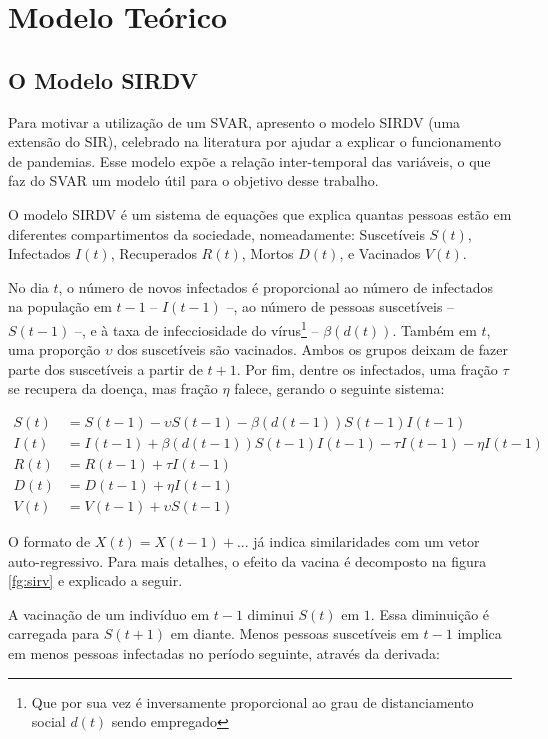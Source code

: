 \documentclass[
    article,
	12pt,				%
	oneside,			%
	a4paper,			%
	english,			%
	brazil,				%
	hyperref = {colorlinks, citecolor=c1d, linkcolor=c2d, urlcolor=c3d, colorlinks}
	]{abntex2}
\newcounter{j}
\begin{document}
\let\clearpage\relax
\chapter{Modelo Teórico}\label{sec:teorico}

\section{O Modelo SIRDV}

Para motivar a utilização de um SVAR, apresento o modelo SIRDV (uma extensão do SIR), celebrado na literatura por ajudar a explicar o funcionamento de pandemias. Esse modelo expõe a relação inter-temporal das variáveis, o que faz do SVAR um modelo útil para o objetivo desse trabalho.

O modelo SIRDV é um sistema de equações que explica quantas pessoas estão em diferentes compartimentos da sociedade, nomeadamente: Suscetíveis $S(t)$, Infectados $I(t)$, Recuperados $R(t)$, Mortos $D(t)$, e Vacinados $V(t)$.

No dia $t$, o número de novos infectados é proporcional ao número de infectados na população em $t-1$ -- $I(t-1)$ --, ao número de pessoas suscetíveis -- $S(t-1)$ --, e à taxa de infecciosidade do vírus\footnote{Que por sua vez é inversamente proporcional ao grau de distanciamento social $d(t)$ sendo empregado} -- $\beta(d(t))$. Também em $t$, uma proporção $\upsilon$ dos suscetíveis são vacinados. Ambos os grupos deixam de fazer parte dos suscetíveis a partir de $t+1$. Por fim, dentre os infectados, uma fração $\tau$ se recupera da doença, mas fração $\eta$ falece, gerando o seguinte sistema:

\begin{align*}
    S(t) &= S(t-1) - \upsilon S(t-1) - \beta(d(t-1))S(t-1)I(t-1)\\
    I(t) &= I(t-1) + \beta(d(t-1))S(t-1)I(t-1) - \tau I(t-1) - \eta I(t-1)\\
    R(t) &= R(t-1) + \tau I(t-1)\\
    D(t) &= D(t-1) + \eta I(t-1)\\
    V(t) &= V(t-1) + \upsilon S(t-1)
\end{align*}

O formato de $X(t) = X(t-1) + ...$ já indica similaridades com um vetor auto-regressivo. Para mais detalhes, o efeito da vacina é decomposto na figura \ref{fg:sirv} e explicado a seguir.

A vacinação de um indivíduo em $t-1$ diminui $S(t)$ em $1$. Essa diminuição é carregada para $S(t+1)$ em diante. Menos pessoas suscetíveis em $t-1$ implica em menos pessoas infectadas no período seguinte, através da derivada:
\end{document}
